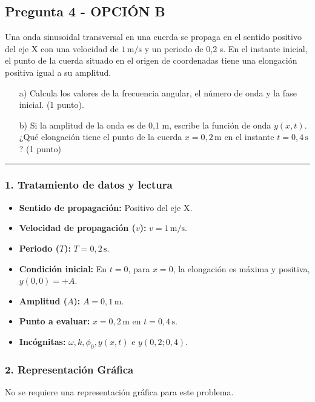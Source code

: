 \newpage

\subsection{Pregunta 4 - OPCIÓN B}
\label{subsec:4B_2019_jul_ext}
\begin{cajaenunciado}
Una onda sinusoidal transversal en una cuerda se propaga en el sentido positivo del eje X con una velocidad de $1\,\text{m/s}$ y un periodo de 0,2 s. En el instante inicial, el punto de la cuerda situado en el origen de coordenadas tiene una elongación positiva igual a su amplitud.
\begin{enumerate}
    \item[a)] Calcula los valores de la frecuencia angular, el número de onda y la fase inicial. (1 punto).
    \item[b)] Si la amplitud de la onda es de 0,1 m, escribe la función de onda $y(x,t)$. ¿Qué elongación tiene el punto de la cuerda $x=0,2\,\text{m}$ en el instante $t=0,4\,\text{s}$? (1 punto)
\end{enumerate}
\end{cajaenunciado}
\hrule

\subsubsection*{1. Tratamiento de datos y lectura}
\begin{itemize}
    \item \textbf{Sentido de propagación:} Positivo del eje X.
    \item \textbf{Velocidad de propagación ($v$):} $v = 1\,\text{m/s}$.
    \item \textbf{Periodo ($T$):} $T=0,2\,\text{s}$.
    \item \textbf{Condición inicial:} En $t=0$, para $x=0$, la elongación es máxima y positiva, $y(0,0)=+A$.
    \item \textbf{Amplitud ($A$):} $A=0,1\,\text{m}$.
    \item \textbf{Punto a evaluar:} $x=0,2\,\text{m}$ en $t=0,4\,\text{s}$.
    \item \textbf{Incógnitas:} $\omega, k, \phi_0, y(x,t)$ e $y(0,2; 0,4)$.
\end{itemize}

\subsubsection*{2. Representación Gráfica}
No se requiere una representación gráfica para este problema.

